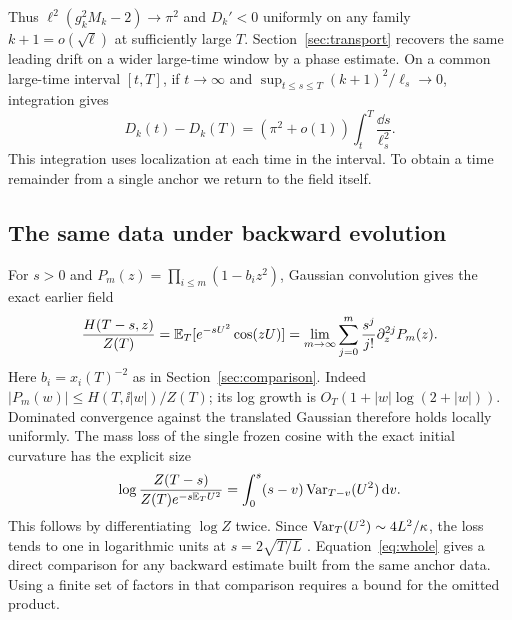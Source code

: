 Thus \(\ell^2(g_k^2M_k-2)\to\pi^2\) and \(D_k'<0\) uniformly on any
family \(k+1=o(\sqrt\ell)\) at sufficiently large \(T\). Section~\ref{sec:transport}
recovers the same leading drift on a wider large-time window by a phase estimate.
On a common large-time interval \([t,T]\), if \(t\to\infty\) and
\(\sup_{t\le s\le T}(k+1)^2/\ell_s\to0\), integration gives
\[
 D_k(t)-D_k(T)
     =(\pi^2+o(1))\int_t^T\frac{\dd s}{\ell_s^2}.
\]
This integration uses localization at each time in the interval. To obtain a time remainder from a single anchor we return to the field itself.

\subsection{The same data under backward evolution}
For \(s>0\) and \(P_m(z)=\prod_{i\le m}(1-b_i z^2)\), Gaussian convolution gives the exact earlier field
\begin{equation}
 \frac{H(T-s,z)}{Z(T)}
   =\mathbb E_T[e^{-sU^2}\cos(zU)]
   =\lim_{m\to\infty}\sum_{j=0}^m\frac{s^j}{j!}\partial_z^{2j}P_m(z).
 \label{eq:whole}
\end{equation}
Here \(b_i=x_i(T)^{-2}\) as in Section~\ref{sec:comparison}. Indeed \(|P_m(w)|\le H(T,\ii|w|)/Z(T)\); its log growth is \(O_T(1+|w|\log(2+|w|))\). Dominated convergence against the translated Gaussian therefore holds locally uniformly. The mass loss of the single frozen cosine with the exact initial curvature has the explicit size
\[
 \log\frac{Z(T-s)}{Z(T)e^{-s\mathbb E_T U^2}}
   =\int_0^s(s-v)\operatorname{Var}_{T-v}(U^2)\,\mathrm d v .
\]
This follows by differentiating \(\log Z\) twice. Since \(\operatorname{Var}_T(U^2)\sim4L^2/\kappa\), the loss tends to one in logarithmic units at \(s=2\sqrt{T/L}\) \cite[\S4]{Founding07}. Equation~\eqref{eq:whole} gives a direct comparison for any backward estimate built from the same anchor data. Using a finite set of factors in that comparison requires a bound for the omitted product.
